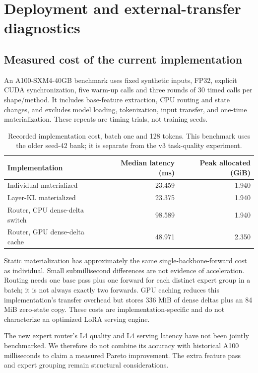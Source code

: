 \documentclass[11pt,a4paper]{article}
\begin{document}
\section{Deployment and external-transfer diagnostics}
\subsection{Measured cost of the current implementation}
An A100-SXM4-40GB benchmark uses fixed synthetic inputs, FP32, explicit CUDA synchronization, five warm-up calls and three rounds of 30 timed calls per shape/method. It includes base-feature extraction, CPU routing and state changes, and excludes model loading, tokenization, input transfer, and one-time materialization. These repeats are timing trials, not training seeds.

\begin{table}[H]\centering\small
\caption{Recorded implementation cost, batch one and 128 tokens. This benchmark uses the older seed-42 bank; it is separate from the v3 task-quality experiment.}
\begin{tabular}{lrr}\toprule
Implementation & Median latency (ms) & Peak allocated (GiB)\\\midrule
Individual materialized &23.459&1.940\\
Layer-KL materialized &23.375&1.940\\
Router, CPU dense-delta switch &98.589&1.940\\
Router, GPU dense-delta cache &48.971&2.350\\\bottomrule
\end{tabular}\end{table}

Static materialization has approximately the same single-backbone-forward cost as individual. Small submillisecond differences are not evidence of acceleration. Routing needs one base pass plus one forward for each distinct expert group in a batch; it is not always exactly two forwards. GPU caching reduces this implementation's transfer overhead but stores 336 MiB of dense deltas plus an 84 MiB zero-state copy. These costs are implementation-specific and do not characterize an optimized LoRA serving engine.

The new expert router's L4 quality and L4 serving latency have not been jointly benchmarked. We therefore do not combine its accuracy with historical A100 milliseconds to claim a measured Pareto improvement. The extra feature pass and expert grouping remain structural considerations.
\end{document}
